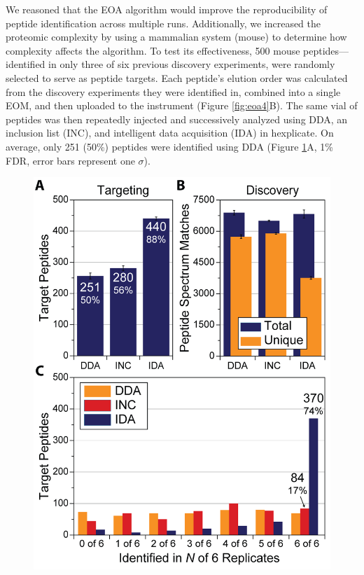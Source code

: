 We reasoned that the EOA algorithm would improve the reproducibility of peptide identification across multiple runs. Additionally, we increased the proteomic complexity by using a mammalian system (mouse) to determine how complexity affects the algorithm. To test its effectiveness, 500 mouse peptides---identified in only three of six previous discovery experiments, were randomly selected to serve as peptide targets. Each peptide's elution order was calculated from the discovery experiments they were identified in, combined into a single EOM, and then uploaded to the instrument (Figure \ref{fig:eoa4}B). The same vial of peptides was then repeatedly injected and successively analyzed using DDA, an inclusion list (INC), and intelligent data acquisition (IDA) in hexplicate. On average, only 251 (50\%) peptides were identified using DDA (Figure \ref{fig:eoa5}A, 1\% FDR, error bars represent one $\sigma$).
\begin{figure}[p]
	\centering
	\includegraphics[width=0.75\columnwidth]{eoa/EOA 5.png}
	\label{fig:eoa5}
\end{figure}  
